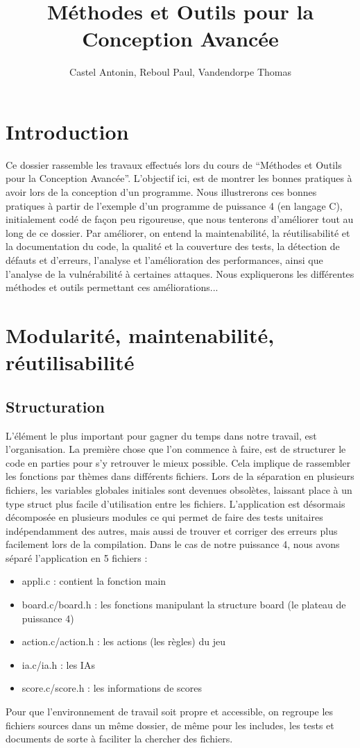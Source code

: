 \documentclass{report}
\title{Méthodes et Outils pour la Conception Avancée}
\author{Castel Antonin, Reboul Paul, Vandendorpe Thomas}
\begin{document}
\maketitle{}
\tableofcontents

\chapter{Introduction}

Ce dossier rassemble les travaux effectués lors du cours de ``Méthodes et Outils pour la Conception Avancée''. L'objectif ici, est de montrer les bonnes pratiques à avoir lors de la conception d'un programme. Nous illustrerons ces bonnes pratiques à partir de l'exemple d'un programme de puissance 4 (en langage C), initialement codé de façon peu rigoureuse, que nous tenterons d'améliorer tout au long de ce dossier. Par améliorer, on entend  la maintenabilité, la réutilisabilité et la documentation du code, la qualité et la couverture des tests, la détection de défauts et d'erreurs, l'analyse et l'amélioration des performances, ainsi que l'analyse de la vulnérabilité à certaines attaques. Nous expliquerons les différentes méthodes et outils permettant ces améliorations...

\chapter{Modularité, maintenabilité, réutilisabilité}
\section{Structuration}
L'élément le plus important pour gagner du temps dans notre travail, est l'organisation. La première chose que l'on commence à faire, est de structurer le code en parties pour s'y retrouver le mieux possible. Cela implique de rassembler les fonctions par thèmes dans différents fichiers. Lors de la séparation en plusieurs fichiers, les variables globales initiales sont devenues obsolètes, laissant place à un type struct plus facile d'utilisation entre les fichiers. L'application est désormais décomposée en plusieurs modules ce qui permet de faire des tests unitaires indépendamment des autres, mais aussi de trouver et corriger des erreurs plus facilement lors de la compilation. Dans le cas de notre puissance 4, nous avons séparé l'application en 5 fichiers :
\begin{itemize}
\item appli.c : contient la fonction main
\item board.c/board.h : les fonctions manipulant la structure board (le plateau de puissance 4)
\item action.c/action.h : les actions (les règles) du jeu
\item ia.c/ia.h : les IAs
\item score.c/score.h : les informations de scores
\end{itemize} 
Pour que l'environnement de travail soit propre et accessible, on regroupe les fichiers sources dans un même dossier, de même pour les includes, les tests et documents de sorte à faciliter la chercher des fichiers.
\end{document}
